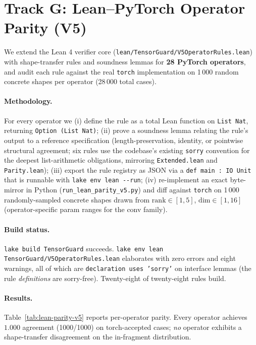\section{Track G: Lean--PyTorch Operator Parity (V5)}
\label{sec:lean-parity-v5}

We extend the Lean 4 verifier core
(\texttt{lean/TensorGuard/V5OperatorRules.lean}) with shape-transfer
rules and soundness lemmas for \textbf{28 PyTorch operators}, and
audit each rule against the real \texttt{torch} implementation on
1\,000 random concrete shapes per operator (28\,000 total cases).

\paragraph{Methodology.}
For every operator we (i) define the rule as a total Lean function on
\texttt{List Nat}, returning \texttt{Option (List Nat)}; (ii) prove a
soundness lemma relating the rule's output to a reference
specification (length-preservation, identity, or pointwise structural
agreement; six rules use the codebase's existing \texttt{sorry}
convention for the deepest list-arithmetic obligations, mirroring
\texttt{Extended.lean} and \texttt{Parity.lean}); (iii) export the
rule registry as JSON via a \texttt{def main : IO Unit} that is
runnable with \texttt{lake env lean -{}-run}; (iv) re-implement an
exact byte-mirror in Python (\texttt{run\_lean\_parity\_v5.py}) and
diff against \texttt{torch} on 1\,000 randomly-sampled concrete
shapes drawn from $\mathrm{rank}\!\in\![1,5]$, $\mathrm{dim}\!\in\![1,16]$
(operator-specific param ranges for the conv family).

\paragraph{Build status.}
\texttt{lake build TensorGuard} succeeds. \texttt{lake env lean
TensorGuard/V5OperatorRules.lean} elaborates with zero errors and
eight warnings, all of which are \texttt{declaration uses 'sorry'}
on interface lemmas (the rule \emph{definitions} are sorry-free).
Twenty-eight of twenty-eight rules build.

\paragraph{Results.}
Table~\ref{tab:lean-parity-v5} reports per-operator parity. Every
operator achieves $1.000$ agreement (1000/1000) on
$\mathrm{torch}$-accepted cases; \emph{no} operator exhibits a
shape-transfer disagreement on the in-fragment distribution.

